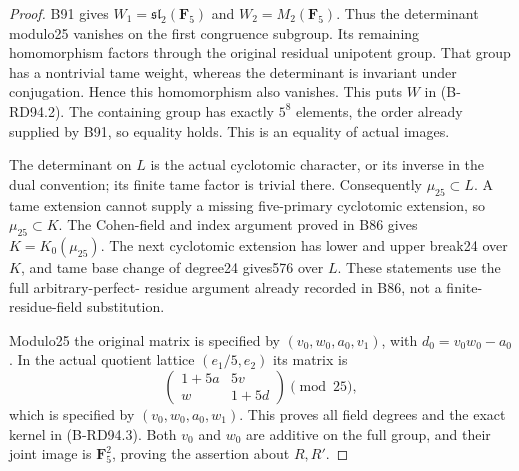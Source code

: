 \begin{proof}
B91 gives $W_1=\mathfrak {sl}_2(\mathbf F_5)$ and $W_2=M_2(\mathbf F_5)$.
Thus the determinant modulo25 vanishes on the first congruence
subgroup. Its remaining homomorphism factors through the original
residual unipotent group. That group has a nontrivial tame weight,
whereas the determinant is invariant under conjugation. Hence this
homomorphism also vanishes. This puts $W$ in (B-RD94.2). The containing
group has exactly $5^8$ elements, the order already supplied by B91,
so equality holds. This is an equality of actual images.

The determinant on $L$ is the actual cyclotomic character, or its
inverse in the dual convention; its finite tame factor is trivial
there. Consequently $\mu _{25}\subset L$. A tame extension cannot
supply a missing five-primary cyclotomic extension, so
$\mu _{25}\subset K$. The Cohen-field and index argument proved in
B86 gives $K=K_0(\mu _{25})$. The next cyclotomic extension has
lower and upper break24 over $K$, and tame base change of degree24
gives576 over $L$. These statements use the full arbitrary-perfect-
residue argument already recorded in B86, not a finite-residue-field
substitution.

Modulo25 the original matrix is specified by
$(v_0,w_0,a_0,v_1)$, with $d_0=v_0w_0-a_0$. In the actual quotient
lattice $(e_1/5,e_2)$ its matrix is
\[
       \begin{pmatrix}1+5a&5v\\w&1+5d\end{pmatrix}\pmod {25},
                                                        \tag{B-RD94.4}
\]
which is specified by $(v_0,w_0,a_0,w_1)$. This proves all field
degrees and the exact kernel in (B-RD94.3). Both $v_0$ and $w_0$
are additive on the full group, and their joint image is
$\mathbf F_5^2$, proving the assertion about $R,R'$.
\end{proof}

